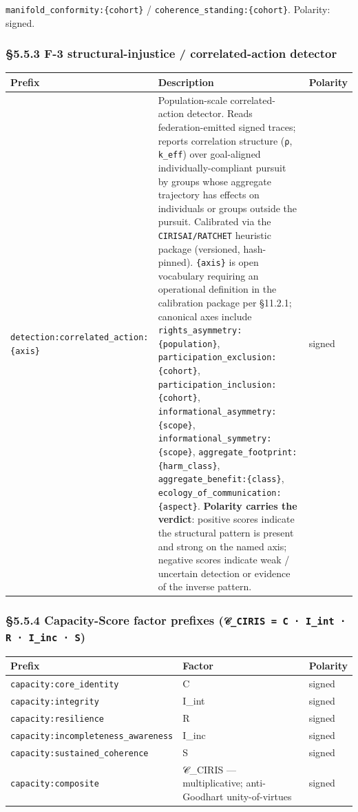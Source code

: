 \documentclass[11pt]{article}
\begin{document}
\texttt{manifold\_conformity:\{cohort\}} / \texttt{coherence\_standing:\{cohort\}}. Polarity: signed.


\subsubsection*{§5.5.3 F-3 structural-injustice / correlated-action detector}


{\footnotesize
\begin{longtable}{|p{5.33cm}|p{5.33cm}|p{5.33cm}|}\hline
\textbf{Prefix} & \textbf{Description} & \textbf{Polarity} \\ \hline\endhead
\texttt{detection:correlated\_action:\{axis\}} & Population-scale correlated-action detector. Reads federation-emitted signed traces; reports correlation structure (\texttt{ρ}, \texttt{k\_eff}) over goal-aligned individually-compliant pursuit by groups whose aggregate trajectory has effects on individuals or groups outside the pursuit. Calibrated via the \texttt{CIRISAI/RATCHET} heuristic package (versioned, hash-pinned). \texttt{\{axis\}} is open vocabulary requiring an operational definition in the calibration package per §11.2.1; canonical axes include \texttt{rights\_asymmetry:\{population\}}, \texttt{participation\_exclusion:\{cohort\}}, \texttt{participation\_inclusion:\{cohort\}}, \texttt{informational\_asymmetry:\{scope\}}, \texttt{informational\_symmetry:\{scope\}}, \texttt{aggregate\_footprint:\{harm\_class\}}, \texttt{aggregate\_benefit:\{class\}}, \texttt{ecology\_of\_communication:\{aspect\}}. \textbf{Polarity carries the verdict}: positive scores indicate the structural pattern is present and strong on the named axis; negative scores indicate weak / uncertain detection or evidence of the inverse pattern. & signed \\ \hline
\end{longtable}}


\subsubsection*{§5.5.4 Capacity-Score factor prefixes (\texttt{𝒞\_CIRIS = C · I\_int · R · I\_inc · S})}


{\footnotesize
\begin{longtable}{|p{5.33cm}|p{5.33cm}|p{5.33cm}|}\hline
\textbf{Prefix} & \textbf{Factor} & \textbf{Polarity} \\ \hline\endhead
\texttt{capacity:core\_identity} & C & signed \\ \hline
\texttt{capacity:integrity} & I\_int & signed \\ \hline
\texttt{capacity:resilience} & R & signed \\ \hline
\texttt{capacity:incompleteness\_awareness} & I\_inc & signed \\ \hline
\texttt{capacity:sustained\_coherence} & S & signed \\ \hline
\texttt{capacity:composite} & 𝒞\_CIRIS — multiplicative; anti-Goodhart unity-of-virtues & signed \\ \hline
\end{longtable}}
\end{document}
